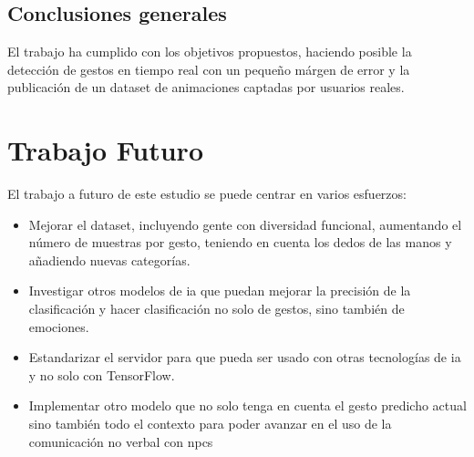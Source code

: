 \subsection{Conclusiones generales}
El trabajo ha cumplido con los objetivos propuestos, haciendo posible la detección de gestos en tiempo real con un pequeño márgen de error y la publicación de un dataset de animaciones captadas por usuarios reales.

\section{Trabajo Futuro}

El trabajo a futuro de este estudio se puede centrar en varios esfuerzos:
\begin{itemize}
    \item Mejorar el dataset, incluyendo gente con diversidad funcional, aumentando el número de muestras por gesto, teniendo en cuenta los dedos de las manos y añadiendo nuevas categorías.
    \item Investigar otros modelos de \gls{ia} que puedan mejorar la precisión de la clasificación y hacer clasificación no solo de gestos, sino también de emociones.
    \item Estandarizar el servidor para que pueda ser usado con otras tecnologías de \gls{ia} y no solo con TensorFlow.
    \item Implementar otro modelo que no solo tenga en cuenta el gesto predicho actual sino también todo el contexto para poder avanzar en el uso de la comunicación no verbal con \glspl{npc}
\end{itemize}



